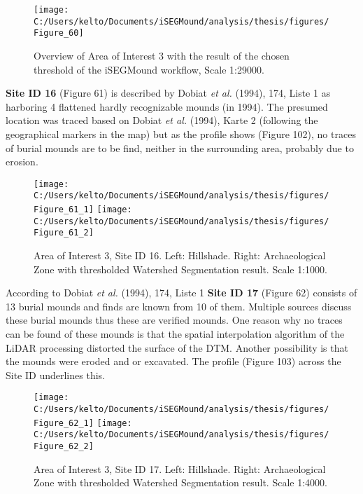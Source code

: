\documentclass[
  12pt,
]{article}
\begin{document}
\begin{figure}

{\centering \texttt{[image: C:/Users/kelto/Documents/iSEGMound/analysis/thesis/figures/Figure\_60]} 

}

\caption{Overview of Area of Interest 3 with the result of the chosen threshold of the iSEGMound workflow, Scale 1:29000.}\label{fig:Figure60}
\end{figure}

\textbf{Site ID 16} (Figure 61) is described by Dobiat \emph{et al.} (1994), 174, Liste 1 as harboring 4 flattened hardly recognizable mounds (in 1994). The presumed location was traced based on Dobiat \emph{et al.} (1994), Karte 2 (following the geographical markers in the map) but as the profile shows (Figure 102), no traces of burial mounds are to be find, neither in the surrounding area, probably due to erosion.

\begin{figure}
\texttt{[image: C:/Users/kelto/Documents/iSEGMound/analysis/thesis/figures/Figure\_61\_1]} \texttt{[image: C:/Users/kelto/Documents/iSEGMound/analysis/thesis/figures/Figure\_61\_2]} \caption{Area of Interest 3, Site ID 16. Left: Hillshade. Right: Archaeological Zone with thresholded Watershed Segmentation result. Scale 1:1000.}\label{fig:Figure61}
\end{figure}

According to Dobiat \emph{et al.} (1994), 174, Liste 1 \textbf{Site ID 17} (Figure 62) consists of 13 burial mounds and finds are known from 10 of them. Multiple sources discuss these burial mounds thus these are verified mounds. One reason why no traces can be found of these mounds is that the spatial interpolation algorithm of the LiDAR processing distorted the surface of the DTM. Another possibility is that the mounds were eroded and or excavated. The profile (Figure 103) across the Site ID underlines this.

\begin{figure}
\texttt{[image: C:/Users/kelto/Documents/iSEGMound/analysis/thesis/figures/Figure\_62\_1]} \texttt{[image: C:/Users/kelto/Documents/iSEGMound/analysis/thesis/figures/Figure\_62\_2]} \caption{Area of Interest 3, Site ID 17. Left: Hillshade. Right: Archaeological Zone with thresholded Watershed Segmentation result. Scale 1:4000.}\label{fig:Figure62}
\end{figure}
\end{document}
